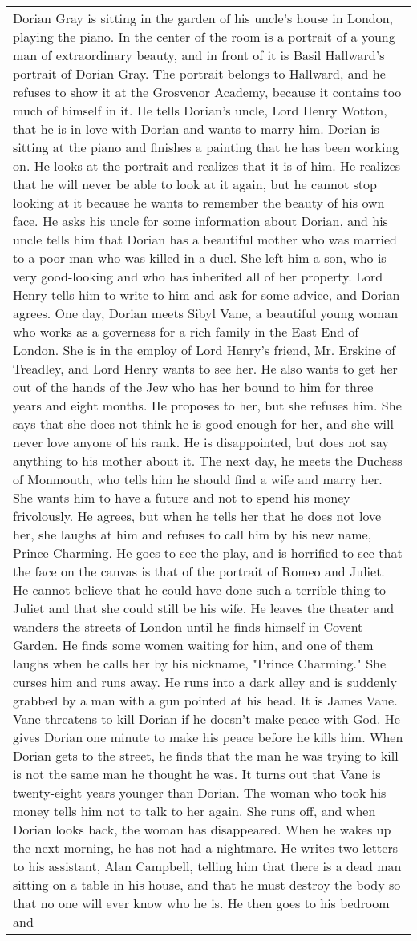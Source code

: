 \begin{table}[!htbp]
\begin{tabular}{p{\linewidth}}
Dorian Gray is sitting in the garden of his uncle's house in London, playing the piano. In the center of the room is a portrait of a young man of extraordinary beauty, and in front of it is Basil Hallward's portrait of Dorian Gray. The portrait belongs to Hallward, and he refuses to show it at the Grosvenor Academy, because it contains too much of himself in it. He tells Dorian's uncle, Lord Henry Wotton, that he is in love with Dorian and wants to marry him. Dorian is sitting at the piano and finishes a painting that he has been working on. He looks at the portrait and realizes that it is of him. He realizes that he will never be able to look at it again, but he cannot stop looking at it because he wants to remember the beauty of his own face. He asks his uncle for some information about Dorian, and his uncle tells him that Dorian has a beautiful mother who was married to a poor man who was killed in a duel. She left him a son, who is very good-looking and who has inherited all of her property. Lord Henry tells him to write to him and ask for some advice, and Dorian agrees. One day, Dorian meets Sibyl Vane, a beautiful young woman who works as a governess for a rich family in the East End of London. She is in the employ of Lord Henry's friend, Mr. Erskine of Treadley, and Lord Henry wants to see her. He also wants to get her out of the hands of the Jew who has her bound to him for three years and eight months. He proposes to her, but she refuses him. She says that she does not think he is good enough for her, and she will never love anyone of his rank. He is disappointed, but does not say anything to his mother about it. The next day, he meets the Duchess of Monmouth, who tells him he should find a wife and marry her. She wants him to have a future and not to spend his money frivolously. He agrees, but when he tells her that he does not love her, she laughs at him and refuses to call him by his new name, Prince Charming. He goes to see the play, and is horrified to see that the face on the canvas is that of the portrait of Romeo and Juliet. He cannot believe that he could have done such a terrible thing to Juliet and that she could still be his wife. He leaves the theater and wanders the streets of London until he finds himself in Covent Garden. He finds some women waiting for him, and one of them laughs when he calls her by his nickname, "Prince Charming." She curses him and runs away. He runs into a dark alley and is suddenly grabbed by a man with a gun pointed at his head. It is James Vane. Vane threatens to kill Dorian if he doesn't make peace with God. He gives Dorian one minute to make his peace before he kills him. When Dorian gets to the street, he finds that the man he was trying to kill is not the same man he thought he was. It turns out that Vane is twenty-eight years younger than Dorian. The woman who took his money tells him not to talk to her again. She runs off, and when Dorian looks back, the woman has disappeared. When he wakes up the next morning, he has not had a nightmare. He writes two letters to his assistant, Alan Campbell, telling him that there is a dead man sitting on a table in his house, and that he must destroy the body so that no one will ever know who he is. He then goes to his bedroom and 
\end{tabular}
\end{table}
